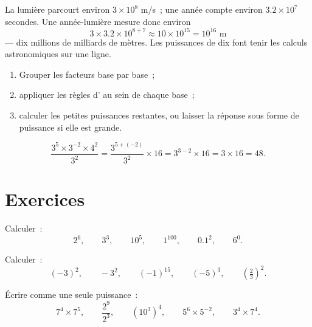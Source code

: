 \begin{example}\label{ex:g8:powers:magnitude}
La lumière parcourt environ $3 \times 10^8$ m/s~; une année compte
environ $3.2 \times 10^7$ secondes. Une année-lumière mesure donc
environ
\[
3 \times 3.2 \times 10^{8+7} \approx 10 \times 10^{15} = 10^{16}
\text{ m}
\]
--- dix millions de milliards de mètres. Les puissances de dix font
tenir les calculs astronomiques sur une ligne.
\end{example}

\begin{method}\label{met:g8:powers:simplify}
\begin{enumerate}
  \item Grouper les facteurs base par base~;
  \item appliquer les règles d' au sein de chaque base~;
  \item calculer les petites puissances restantes, ou laisser la
        réponse sous forme de puissance si elle est grande.
\end{enumerate}
\end{method}

\begin{example}\label{ex:g8:powers:simplify}
\[
\frac{3^5 \times 3^{-2} \times 4^2}{3^2}
= \frac{3^{5 + (-2)}}{3^2} \times 16
= 3^{3 - 2} \times 16
= 3 \times 16 = 48 .
\]
\end{example}

\section{Exercices}

\begin{exercise}[$\star$]\label{exo:g8:powers:1}
Calculer~:
\[
2^6, \qquad 3^3, \qquad 10^5, \qquad 1^{100}, \qquad 0.1^2, \qquad
6^0 .
\]
\end{exercise}

\begin{exercise}[$\star$]\label{exo:g8:powers:2}
Calculer~:
\[
(-3)^2, \qquad -3^2, \qquad (-1)^{15}, \qquad (-5)^3, \qquad
\left(\tfrac{2}{3}\right)^2 .
\]
\end{exercise}

\begin{exercise}[$\star$]\label{exo:g8:powers:3}
Écrire comme une seule puissance~:
\[
7^4 \times 7^5, \qquad
\frac{2^9}{2^3}, \qquad
\left(10^3\right)^4, \qquad
5^6 \times 5^{-2}, \qquad
3^4 \times 7^4 .
\]
\end{exercise}

